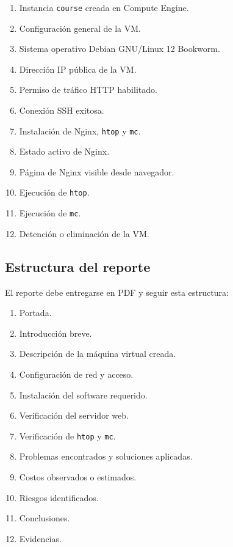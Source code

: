\documentclass[
  coursetitle={Cómputo Nube y Tecnologías Emergentes},
  coursehours={96},
  coursedate={Verano 2026},
  doctype={Tarea 2},
  otherlangs={english,french},
  authorname={Lázaro},
  authorsurname={Bustio-Martínez},
  authortitle={PhD},
  role={Profesor Investigador},
  email={lbustio@inaoe.mx},
  phone={5559504000},
  ext={7459},
  institution={Instituto Nacional de Astrofísica, Óptica y Electrónica (INAOE)},
  department={Maestría en Ciencias en Tecnologías de Seguridad},
  address={Luis Enrique Erro 1, Sta. Ma. Tonantzintla, San Andrés Cholula, CP 72840, Puebla, México},
  margin={0.5in}
]{../../../lbustio_lecture_notes}
\begin{document}
\begin{enumerate}
  \item Instancia \texttt{course} creada en Compute Engine.
  \item Configuración general de la VM.
  \item Sistema operativo Debian GNU/Linux 12 Bookworm.
  \item Dirección IP pública de la VM.
  \item Permiso de tráfico HTTP habilitado.
  \item Conexión SSH exitosa.
  \item Instalación de Nginx, \texttt{htop} y \texttt{mc}.
  \item Estado activo de Nginx.
  \item Página de Nginx visible desde navegador.
  \item Ejecución de \texttt{htop}.
  \item Ejecución de \texttt{mc}.
  \item Detención o eliminación de la VM.
\end{enumerate}

\subsection{Estructura del reporte}
\label{sec:tarea2-estructura-reporte}

El reporte debe entregarse en PDF y seguir esta estructura:

\begin{enumerate}
  \item Portada.
  \item Introducción breve.
  \item Descripción de la máquina virtual creada.
  \item Configuración de red y acceso.
  \item Instalación del software requerido.
  \item Verificación del servidor web.
  \item Verificación de \texttt{htop} y \texttt{mc}.
  \item Problemas encontrados y soluciones aplicadas.
  \item Costos observados o estimados.
  \item Riesgos identificados.
  \item Conclusiones.
  \item Evidencias.
\end{enumerate}
\end{document}
